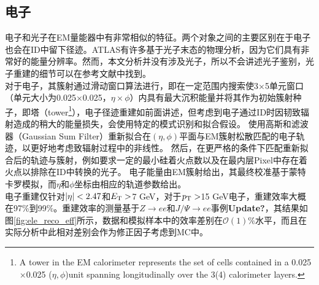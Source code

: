 \subsection{电子}
电子和光子在EM量能器中有非常相似的特征。两个对象之间的主要区别在于电子也会在ID中留下径迹。ATLAS有许多基于光子末态的物理分析，因为它们具有非常好的能量分辨率。然而，本文分析并没有涉及光子，所以不会讲述光子鉴别，光子重建的细节可以在参考文献\cite{ATLAS-CONF-2012-123}中找到。\\
对于电子，其簇射通过滑动窗口算法进行\cite{Lampl:1099735}，即在一定范围内搜索使3$\times$5单元窗口（单元大小为0.025$\times$0.025，$\eta\times\phi$）内具有最大沉积能量并将其作为初始簇射种子，即塔（tower\footnote{A tower in the EM calorimeter represents the set of cells contained in a 0.025$\times$0.025 ($\eta,\phi$)unit spanning longitudinally over the 3(4) calorimeter layers.}），电子径迹重建如前面讲述，但考虑到电子通过ID时因韧致辐射造成的稍大的能量损失，会使用特定的模式识别和拟合假设。
使用高斯和滤波器（Gaussian Sum Filter）\cite{ATLAS-CONF-2012-047}重新拟合在$(\eta,\phi)$平面与EM簇射松散匹配的电子轨迹，以更好地考虑致辐射过程中的非线性。 然后，在更严格的条件下匹配重新拟合后的轨迹与簇射，例如要求一定的最小硅着火点数以及在最内层Pixel中存在着火点以排除在ID中转换的光子。 电子能量由EM簇射给出，其最终校准基于蒙特卡罗模拟\cite{Aad2014-cali}，而$\eta$和$\phi$坐标由相应的轨道参数给出。\\
电子重建仅针对$|\eta|<2.47$和$E_{\text{T}} >$7 GeV，对于$p_{\text{T}}>$15 GeV电子，重建效率大概在97\%到99\%。重建效率的测量基于$Z\rightarrow ee$和$J/\Psi\rightarrow ee$事例\cite{ATLAS-CONF-2016-024}\textbf{Update?}，其结果如图\ref{fig:ele_reco_eff}所示，数据和模拟样本中的效率差别在$\mathcal{O}(1)\%$水平，而且在实际分析中此相对差别会作为修正因子考虑到MC中。
